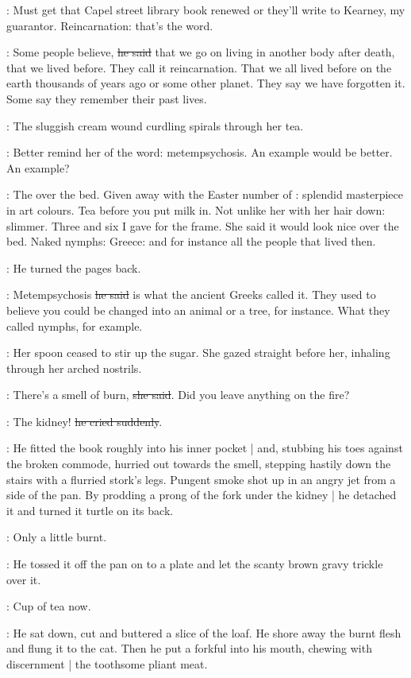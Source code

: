 \BloomInt:
Must get that Capel street library book renewed
or they'll write to Kearney, my guarantor.
Reincarnation:
that's the word.

\Bloom:
Some people believe,
\sout{he said}
that we go on living in another body after death,
that we lived before.
They call it reincarnation.
That we all lived before on the earth thousands of years ago
or some other planet.
They say we have forgotten it.
Some say they remember their past lives.

:
The sluggish cream wound curdling spirals through her tea.

\BloomInt:
Better remind her of the word:
metempsychosis.
An example would be better.
An example?

\BloomInt:
The  over the bed.
Given away with the Easter number of :
splendid masterpiece in art colours.
Tea before you put milk in.
Not unlike her with her hair down:
slimmer.
Three and six I gave for the frame.
She said it would look nice over the bed.
Naked nymphs:
Greece:
and for instance all the people that lived then.

:
He turned the pages back.

\Bloom:
Metempsychosis
\sout{he said}
is what the ancient Greeks called it.
They used to believe
you could be changed into an animal or a tree,
for instance.
What they called nymphs, for example.

:
Her spoon ceased to stir up the sugar.
She gazed straight before her,
inhaling through her arched nostrils.

\Molly:
There's a smell of burn,
\sout{she said}.
Did you leave anything on the fire?

\Bloom:
The kidney!
\sout{he cried suddenly}.

:
He fitted the book roughly into his inner pocket |
and, stubbing his toes against the broken commode,
hurried out towards the smell,
stepping hastily down the stairs with a flurried stork's legs.
Pungent smoke shot up in an angry jet from a side of the pan.
By prodding a prong of the fork under the kidney |
he detached it and turned it turtle on its back.

\BloomInt:
Only a little burnt.

:
He tossed it off the pan on to a plate
and let the scanty brown gravy trickle over it.

\BloomInt:
Cup of tea now.

:
He sat down, cut and buttered a slice of the loaf.
He shore away the burnt flesh and flung it to the cat.
Then he put a forkful into his mouth,
chewing with discernment |
the toothsome pliant meat.


